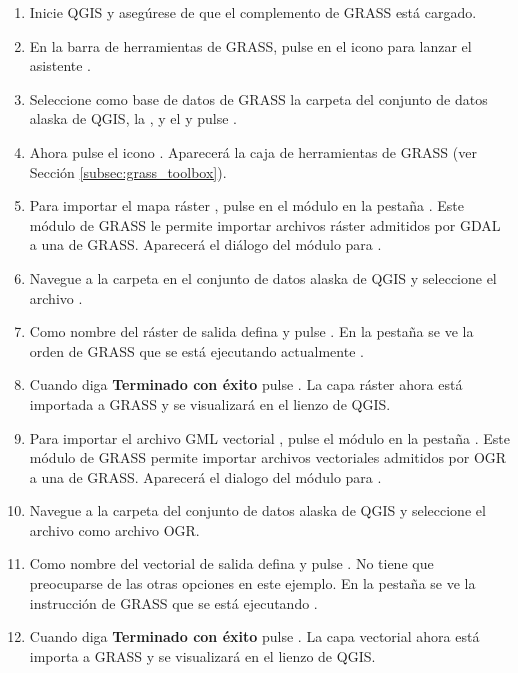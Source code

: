 \begin{enumerate}
  \item Inicie QGIS y asegúrese de que el complemento de GRASS está cargado.
  \item En la barra de herramientas de GRASS, pulse en el icono 
   para lanzar el asistente
  .
  \item Seleccione como base de datos de GRASS la carpeta  del conjunto 
  de datos alaska de QGIS, la , y el  
   y pulse .
  \item Ahora pulse el icono . Aparecerá la caja de herramientas de 
  GRASS (ver Sección \ref{subsec:grass_toolbox}).
  \item Para importar el mapa ráster , pulse en el módulo 
   en la pestaña 
  . Este módulo de GRASS le permite importar archivos ráster admitidos por GDAL a una 
   de GRASS. Aparecerá el diálogo del módulo para .
  \item Navegue a la carpeta  en el conjunto de datos alaska de QGIS y seleccione el archivo .
  \item Como nombre del ráster de salida defina  y pulse 
  . En la pestaña  se ve la orden de GRASS que se está ejecutando actualmente 
  .
  \item Cuando diga \textbf{Terminado con éxito} pulse . 
  La capa ráster  ahora está importada a GRASS y se visualizará en el lienzo de QGIS.
  \item Para importar el archivo GML vectorial , pulse el módulo 
   en la pestaña . Este módulo de GRASS permite importar archivos vectoriales admitidos 
  por OGR a una  de GRASS. Aparecerá el dialogo del módulo para
  .
  \item Navegue a la carpeta  del conjunto de datos alaska de QGIS y seleccione el archivo  como archivo OGR.
  \item Como nombre del vectorial de salida defina  y pulse 
  . No tiene que preocuparse 
  de las otras opciones en este ejemplo. En la pestaña  se ve la instrucción de GRASS que se está ejecutando
  .
  \item Cuando diga \textbf{Terminado con éxito} pulse . 
  La capa vectorial  ahora está importa a GRASS y se visualizará en el lienzo de QGIS.
\end{enumerate}


